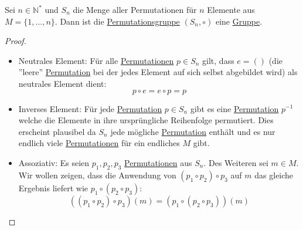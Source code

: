 \documentclass[../../main.tex]{subfiles}
\begin{document}
		\begin{theorem}
			Sei $n \in \mathbb{N}^*$ und $S_n$ die Menge aller Permutationen für $n$ Elemente aus $M = \{1,...,n\}$. Dann ist die \hyperref[def:Permutationsgruppe]{Permutationsgruppe} $(S_n, \circ)$ eine \hyperref[def:Gruppe]{Gruppe}.
			\begin{proof}\hspace*{1cm}
				\begin{itemize}
					\item Neutrales Element: Für alle \hyperref[def:Permutation]{Permutationen} $p \in S_n$ gilt, dass $e = ()$ (die ''leere'' \hyperref[def:Permutation]{Permutation} bei der jedes Element auf sich selbst abgebildet wird) als neutrales Element dient: $$p \circ e = e \circ p = p$$
					\item Inverses Element: Für jede \hyperref[def:Permutation]{Permutation} $p \in S_n$ gibt es eine \hyperref[def:Permutation]{Permutation} $p^{-1}$ welche die Elemente in ihre ursprüngliche Reihenfolge permutiert. Dies erscheint plausibel da $S_n$ jede mögliche \hyperref[def:Permutation]{Permutation} enthält und es nur endlich viele \hyperref[def:Permutation]{Permutationen} für ein endliches $M$ gibt.
					\item Assoziativ: Es seien $p_1,p_2,p_3$ \hyperref[def:Permutation]{Permutationen} aus $S_n$. Des Weiteren sei $m\in M$. Wir wollen zeigen, dass die Anwendung von $(p_1 \circ p_2) \circ p_3$ auf $m$ das gleiche Ergebnis liefert wie $p_1 \circ (p_2 \circ p_3)$: $$((p_1 \circ p_2) \circ p_3)(m)=(p_1 \circ (p_2 \circ p_3))(m)$$
				\end{itemize}
			\end{proof}
		\end{theorem}
	
\end{document}
